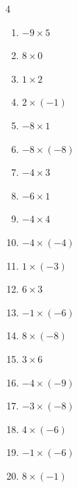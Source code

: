 \begin{multicols}{4}
\begin{enumerate}
  \item $-9\times 5$
        \phantom{$=-45$}

  \item $8\times 0$
        \phantom{$=0$}

  \item $1\times 2$
        \phantom{$=2$}

  \item $2\times (-1)$
        \phantom{$=-2$}

  \item $-8\times 1$
        \phantom{$=-8$}

  \item $-8\times (-8)$
        \phantom{$=64$}

  \item $-4\times 3$
        \phantom{$=-12$}

  \item $-6\times 1$
        \phantom{$=-6$}

  \item $-4\times 4$
        \phantom{$=-16$}

  \item $-4\times (-4)$
        \phantom{$=16$}

  \item $1\times (-3)$
        \phantom{$=-3$}

  \item $6\times 3$
        \phantom{$=18$}

  \item $-1\times (-6)$
        \phantom{$=6$}

  \item $8\times (-8)$
        \phantom{$=-64$}

  \item $3\times 6$
        \phantom{$=18$}

  \item $-4\times (-9)$
        \phantom{$=36$}

\columnbreak %

  \item $-3\times (-8)$
        \phantom{$=24$}

  \item $4\times (-6)$
        \phantom{$=-24$}

  \item $-1\times (-6)$
        \phantom{$=6$}

  \item $8\times (-1)$
        \phantom{$=-8$}


\end{enumerate}
\end{multicols}
